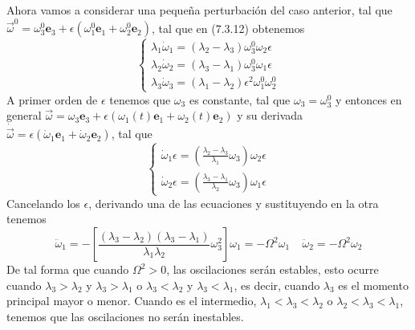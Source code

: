 Ahora vamos a considerar una pequeña perturbación del caso anterior, tal que $\vec{\omega}^0 = \omega_3^0 \mathbf{e}_3 + \epsilon (\omega_1^0 \mathbf{e}_1+\omega_2^0\mathbf{e}_2)$, tal que en (7.3.12) obtenemos
\begin{equation} \label{6.1.1}
    \left\{\begin{matrix}
        \lambda_1 \dot{\omega}_1 = (\lambda_2-\lambda_3) \omega_3^0 \omega_2 \epsilon \\
        \lambda_2 \dot{\omega}_2 = (\lambda_3-\lambda_1) \omega_3^0 \omega_1 \epsilon\\
        \lambda_3 \dot{\omega}_3 = (\lambda_1-\lambda_2) \epsilon^2 \omega_1^0 \omega_2^0 
    \end{matrix}\right.
\end{equation}
A primer orden de $\epsilon$ tenemos que $\omega_3$ es constante, tal que $\omega_3 = \omega_3^0$ y entonces en general $\vec{\omega} = \omega_3 \mathbf{e}_3 + \epsilon (\omega_1(t) \mathbf{e}_1+\omega_2(t)\mathbf{e}_2)$ y su derivada $\dot{\vec{\omega}}= \epsilon(\dot{\omega}_1 \mathbf{e}_1+\dot{\omega}_2\mathbf{e}_2)$, tal que 
\begin{equation} \label{6.1.1}
    \left\{\begin{matrix}
        \dot{\omega}_1 \epsilon = \left(\frac{\lambda_2-\lambda_3}{\lambda_1} \omega_3\right) \omega_2 \epsilon \\
        \dot{\omega}_2 \epsilon = \left(\frac{\lambda_3-\lambda_1}{\lambda_2} \omega_3\right)  \omega_1 \epsilon
    \end{matrix}\right.
\end{equation}
Cancelando los $\epsilon$, derivando una de las ecuaciones y sustituyendo en la otra tenemos 
\begin{equation} \label{6.1.1}
    \ddot{\omega}_1 = -\left[\frac{(\lambda_3-\lambda_2)(\lambda_3-\lambda_1)}{\lambda_1 \lambda_2} \omega_3^2\right] \omega_1 = - \Omega^2 \omega_1 \ \ \ \ \ \ddot{\omega}_2 = - \Omega^2 \omega_2
\end{equation}
De tal forma que cuando $\Omega^2 >0$, las oscilaciones serán estables, esto ocurre cuando $\lambda_3 > \lambda_2$ y $\lambda_3 > \lambda_1$ o $\lambda_3 < \lambda_2$ y $\lambda_3 < \lambda_1$, es decir, cuando $\lambda_3$ es el momento principal mayor o menor. Cuando es el intermedio, $\lambda_1 < \lambda_3 < \lambda_2$ o $\lambda_2 < \lambda_3 < \lambda_1$, tenemos que las oscilaciones no serán inestables.


